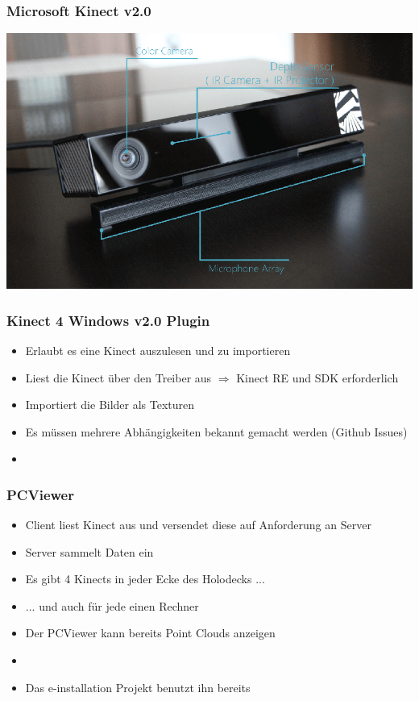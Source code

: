 \documentclass[18pt]{beamer}
\begin{document}
\begin{frame}
	\frametitle{Microsoft Kinect v2.0} 
	\includegraphics[width=0.7\paperwidth]{img/Kinectv2}
\end{frame}

\begin{frame}
	\frametitle{Kinect 4 Windows v2.0 Plugin} 
	\begin{itemize}
		\item Erlaubt es eine Kinect auszulesen und zu importieren
		\item Liest die Kinect über den Treiber aus $\Rightarrow$ Kinect RE und SDK erforderlich
		\item Importiert die Bilder als Texturen
		\item Es müssen mehrere Abhängigkeiten bekannt gemacht werden (Github Issues)
		\item {}
	\end{itemize}

\end{frame}

\begin{frame}
	\frametitle{PCViewer} 
	\begin{itemize}
		\item Client liest Kinect aus und versendet diese auf Anforderung an Server
		\item Server sammelt Daten ein
		\item Es gibt 4 Kinects in jeder Ecke des Holodecks ...
		\pause
		\item ... und auch für jede einen Rechner
		\item Der PCViewer kann bereits Point Clouds anzeigen
		\item {}
		\pause
		\item Das e-installation Projekt benutzt ihn bereits
	\end{itemize}
\end{frame}
\end{document}
